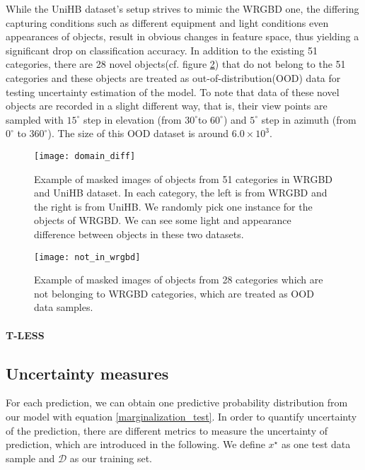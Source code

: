 While the UniHB dataset's setup strives to mimic the WRGBD one, the differing capturing conditions such as different equipment and light conditions even appearances of objects, result in obvious changes in feature space, thus yielding a significant drop on classification accuracy. In addition to the existing 51 categories, there are 28 novel objects(cf. figure \ref{fig:not_in_wrgbd}) that do not belong to the 51 categories and these objects are treated as out-of-distribution(OOD) data for testing uncertainty estimation of the model. To note that data of these novel objects are recorded in a slight different way, that is, their view points are sampled with $15^{\circ}$ step in elevation (from $30^{\circ}$to $60^{\circ}$) and $5^\circ$ step in azimuth (from $0^\circ$ to $360^\circ$). The size of this OOD dataset is around $6.0\times10^3$.


 \begin{figure}[H]
 	\begin{center}
 		\texttt{[image: domain\_diff]}
 		\caption{Example of masked images of objects from 51 categories in WRGBD and UniHB dataset. In each category, the left is from WRGBD and the right is from UniHB. We randomly pick one instance for the objects of WRGBD. We can see some light and appearance difference between objects in these two datasets.}		
 		\label{fig:wrgbd2}
 	\end{center}
 \end{figure}

\begin{figure}[H]
	\begin{center}
		\texttt{[image: not\_in\_wrgbd]}
		\caption{Example of masked images of objects from 28 categories which are not belonging to WRGBD categories, which are treated as OOD data samples.}		
		\label{fig:not_in_wrgbd}
	\end{center}
\end{figure} 

\paragraph{T-LESS\cite{hodan2017tless}}


\subsection{Uncertainty measures}
For each prediction, we can obtain one predictive probability distribution from our model with equation \ref{marginalization_test}. In order to quantify uncertainty of the prediction, there are different metrics to measure the uncertainty of prediction, which are introduced in the following. We define $x^\star$ as one test data sample and $\mathcal D$ as our training set. 
